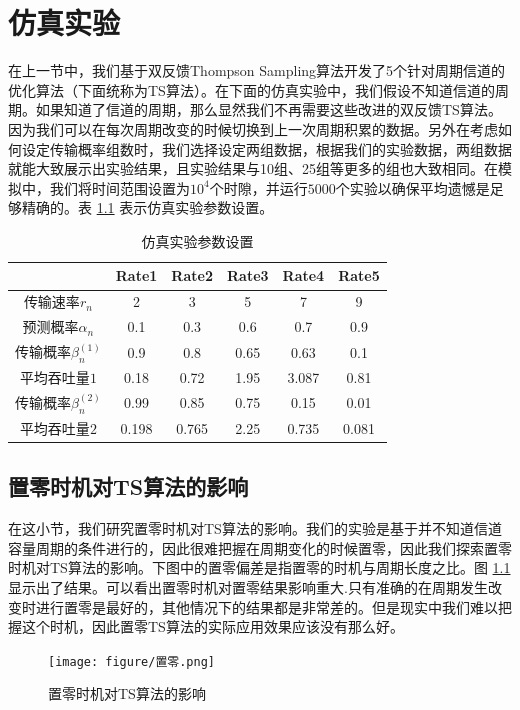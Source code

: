 \chapter{仿真实验}
在上一节中，我们基于双反馈Thompson Sampling算法开发了5个针对周期信道的优化算法（下面统称为TS算法）。在下面的仿真实验中，我们假设不知道信道的周期。如果知道了信道的周期，那么显然我们不再需要这些改进的双反馈TS算法。因为我们可以在每次周期改变的时候切换到上一次周期积累的数据。另外在考虑如何设定传输概率组数时，我们选择设定两组数据，根据我们的实验数据，两组数据就能大致展示出实验结果，且实验结果与10组、25组等更多的组也大致相同。在模拟中，我们将时间范围设置为$10^4$个时隙，并运行$5000$个实验以确保平均遗憾是足够精确的。表 \ref{tabA1} 表示仿真实验参数设置。
\begin{table}[h]
	\centering
	\caption{仿真实验参数设置}		
	\label{tabA1}
	\begin{tabular}{c|c|c|c|c|c}
		\toprule[2pt]
		& Rate1 & Rate2 & Rate3 & Rate4 & Rate5 \\
		\midrule[2pt]
		传输速率$r_{n}$	& 2	& 3	& 5 & 7 & 9 \\
		\hline                                        %
		预测概率$\alpha_{n}$ & 0.1 & 0.3 & 0.6 & 0.7 & 0.9 \\
		\hline                                         %
		传输概率$\beta_{n}^{(1)}$ & 0.9 & 0.8 & 0.65 & 0.63 & 0.1 \\
		\hline
		平均吞吐量$1$ & 0.18 & 0.72 & 1.95 & 3.087 & 0.81 \\                                      %
		\hline   
		传输概率$\beta_{n}^{(2)}$ & 0.99 & 0.85 & 0.75 & 0.15 & 0.01 \\
		
		\hline
		平均吞吐量$2$ & 0.198 & 0.765 & 2.25 & 0.735 & 0.081 \\
		\bottomrule[2pt]
	\end{tabular}
\end{table}
\section{置零时机对TS算法的影响}
在这小节，我们研究置零时机对TS算法的影响。我们的实验是基于并不知道信道容量周期的条件进行的，因此很难把握在周期变化的时候置零，因此我们探索置零时机对TS算法的影响。下图中的置零偏差是指置零的时机与周期长度之比。图 \ref{fig置零} 显示出了结果。可以看出置零时机对置零结果影响重大.只有准确的在周期发生改变时进行置零是最好的，其他情况下的结果都是非常差的。但是现实中我们难以把握这个时机，因此置零TS算法的实际应用效果应该没有那么好。
\begin{figure}[h]
	\centering
	\texttt{[image: figure/置零.png]}
	\caption{置零时机对TS算法的影响} 
	\label{fig置零}
\end{figure}


